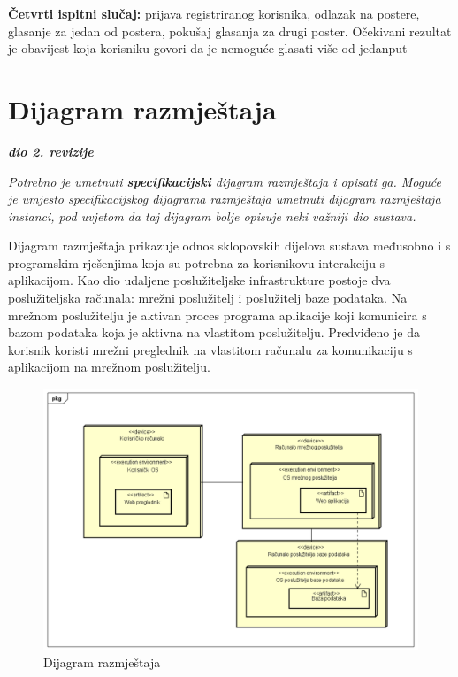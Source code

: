 		 	\textbf{Četvrti ispitni slučaj:} prijava registriranog korisnika, odlazak na postere, glasanje za jedan od postera, pokušaj glasanja za drugi poster. Očekivani rezultat je obavijest koja korisniku govori da je nemoguće glasati više od jedanput
			
			\eject 
		
		
		\section{Dijagram razmještaja}
			
			\textbf{\textit{dio 2. revizije}}
			
			 \textit{Potrebno je umetnuti \textbf{specifikacijski} dijagram razmještaja i opisati ga. Moguće je umjesto specifikacijskog dijagrama razmještaja umetnuti dijagram razmještaja instanci, pod uvjetom da taj dijagram bolje opisuje neki važniji dio sustava.}
			 
			 \indent Dijagram razmještaja prikazuje odnos sklopovskih dijelova sustava međusobno i s programskim rješenjima koja su potrebna za korisnikovu interakciju s aplikacijom. Kao dio udaljene poslužiteljske infrastrukture postoje dva poslužiteljska računala: mrežni poslužitelj i poslužitelj baze podataka. Na mrežnom poslužitelju je aktivan proces programa aplikacije koji komunicira s bazom podataka koja je aktivna na vlastitom poslužitelju. Predviđeno je da korisnik koristi mrežni preglednik na vlastitom računalu za komunikaciju s aplikacijom na mrežnom poslužitelju.
			 
			 \begin{figure} [hbt!]
			 	\includegraphics[width=\linewidth]{Slike/DeploymentDiagram}
			 	\caption{Dijagram razmještaja}
			 \end{figure}
			
